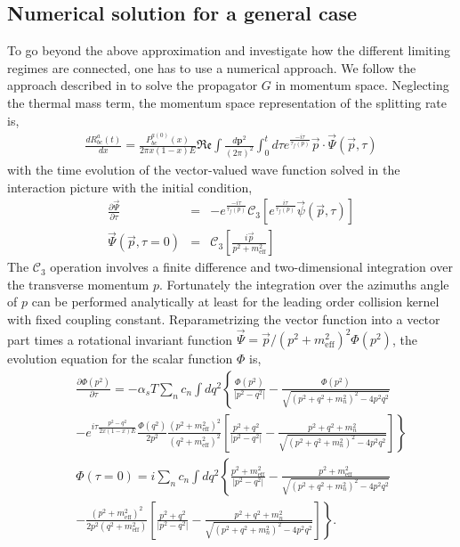 \subsection{Numerical solution for a general case}
To go beyond the above approximation and investigate how the different limiting regimes are connected, one has to use a numerical approach.
We follow the approach described in \cite{CaronHuot:2010bp} to solve the propagator $G$ in momentum space.
Neglecting the thermal mass term, the momentum space representation of the splitting rate is,
\begin{eqnarray}
\frac{dR^{a}_{bc}(t)}{dx} = \frac{P^{a(0)}_{bc}(x)}{2\pi x(1-x)E} \mathfrak{Re} \int \frac{d\mathbf{p}^2}{(2\pi)^2} \int_0^t d\tau e^{\frac{-i\tau}{\tau_f(p)}} \vec{p}\cdot \vec{\Psi}(\vec{p}, \tau)
\end{eqnarray}
with the time evolution of the vector-valued wave function solved in the interaction picture with the initial condition,
\begin{eqnarray}
\frac{\partial \vec{\Psi}}{\partial \tau} &=& - e^{\frac{-i\tau}{\tau_f(p)}} \mathcal{C}_3\left[e^{\frac{i\tau}{\tau_f(p)}}\vec{\psi}(\vec{p}, \tau)\right]\\
\vec{\Psi}(\vec{p}, \tau=0) &=& \mathcal{C}_3\left[\frac{i\vec{p}}{p^2+m^2_{\textrm{eff}}}\right]
\end{eqnarray}
The $\mathcal{C}_3$ operation involves a finite difference and two-dimensional integration over the transverse momentum $p$. 
Fortunately the integration over the azimuths angle of $p$ can be performed analytically at least for the leading order collision kernel with fixed coupling constant.
Reparametrizing the vector function into a vector part times a rotational invariant function $\vec{\Psi} = \vec{p}/(p^2+m^2_{\textrm{eff}})^2 \Phi(p^2)$, the evolution equation for the scalar function $\Phi$ is,
\begin{eqnarray}
&&\frac{\partial \Phi(p^2)}{\partial \tau} = - \alpha_s T \sum_n c_n \int dq^2 \left\{\frac{\Phi(p^2)}{|p^2-q^2|} - \frac{\Phi(p^2)}{\sqrt{(p^2+q^2+m_n^2)^2 - 4p^2q^2}}\right. \\\nonumber
&&\left.- e^{i\tau\frac{p^2-q^2}{2x(1-x)E}}\frac{\Phi(q^2)}{2p^2}\frac{(p^2+m^2_{\textrm{eff}})^2}{(q^2+m^2_{\textrm{eff}})^2} \left[\frac{p^2+q^2}{|p^2-q^2|} - \frac{p^2+q^2+m_n^2}{\sqrt{(p^2+q^2+m_n^2)^2 - 4p^2q^2}}\right]\right\}\\
&&\Phi(\tau=0)= i\sum_n c_n \int dq^2 \left\{\frac{p^2+m^2_{\textrm{eff}}}{|p^2-q^2|} - \frac{p^2+m^2_{\textrm{eff}}}{\sqrt{(p^2+q^2+m_n^2)^2 - 4p^2q^2}}\right. \\\nonumber
&&\left.-\frac{(p^2+m^2_{\textrm{eff}})^2}{2p^2(q^2+m^2_{\textrm{eff}})} \left[\frac{p^2+q^2}{|p^2-q^2|} - \frac{p^2+q^2+m_n^2}{\sqrt{(p^2+q^2+m_n^2)^2 - 4p^2q^2}}\right]\right\}.
\end{eqnarray}
